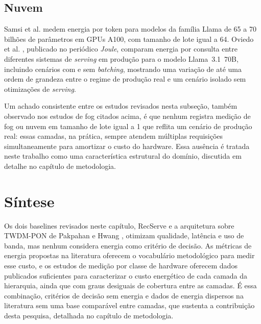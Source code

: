 \documentclass[cic,dipl]{infufrgs}
\begin{document}
\subsection{Nuvem}

Samsi et al. \cite{samsi2023words2watts} medem energia por token para
modelos da fam\'ilia Llama de 65 a 70 bilh\~oes de par\^ametros em GPUs
A100, com tamanho de lote igual a 64. Oviedo et al.
\cite{oviedo2026joule}, publicado no peri\'odico \emph{Joule}, comparam
energia por consulta entre diferentes sistemas de \emph{serving} em
produ\c{c}\~ao para o modelo Llama~3.1~70B, incluindo cen\'arios com e
sem \emph{batching}, mostrando uma varia\c{c}\~ao de at\'e uma ordem de
grandeza entre o regime de produ\c{c}\~ao real e um cen\'ario isolado
sem otimiza\c{c}\~oes de \emph{serving}.

Um achado consistente entre os estudos revisados nesta subse\c{c}\~ao,
tamb\'em observado nos estudos de fog citados acima, \'e que nenhum
registra medi\c{c}\~ao de fog ou nuvem em tamanho de lote igual a 1 que
reflita um cen\'ario de produ\c{c}\~ao real: essas camadas, na pr\'atica,
sempre atendem m\'ultiplas requisi\c{c}\~oes simultaneamente para
amortizar o custo do hardware. Essa aus\^encia \'e tratada neste
trabalho como uma caracter\'istica estrutural do dom\'inio, discutida em
detalhe no cap\'itulo de metodologia.

\section{S\'intese}
\label{sec:sintese}

Os dois baselines revisados neste cap\'itulo, RecServe
\cite{wu2025recserve} e a arquitetura sobre TWDM-PON de Pakpahan e Hwang
\cite{pakpahan2026continuum}, otimizam qualidade, lat\^encia e uso de
banda, mas nenhum considera energia como crit\'erio de decis\~ao. As
m\'etricas de energia propostas na literatura \cite{solovyeva2026green,
li2026ecothink} oferecem o vocabul\'ario metodol\'ogico para medir esse
custo, e os estudos de medi\c{c}\~ao por classe de hardware
\cite{cai2026npu, kubwimana2025edgereasoning,
fadelargerich2026wattcounts, fadelargerich2026wattgpu,
wilhelm2026energypertoken, samsi2023words2watts, oviedo2026joule}
oferecem dados publicados suficientes para caracterizar o custo
energ\'etico de cada camada da hierarquia, ainda que com graus
desiguais de cobertura entre as camadas. \'E essa combina\c{c}\~ao,
crit\'erios de decis\~ao sem energia e dados de energia dispersos na
literatura sem uma base comparável entre camadas, que sustenta a
contribui\c{c}\~ao desta pesquisa, detalhada no cap\'itulo de
metodologia.



\end{document}
